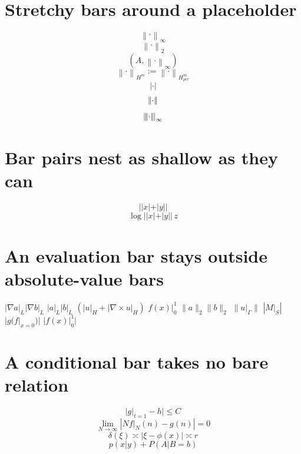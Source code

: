\documentclass{article}
\begin{document}
\section{Stretchy bars around a placeholder}
\[ \left\|\cdot\right\|_{\infty} \]
\[ \left\lVert\cdot\right\rVert_{2} \]
\[ (A,\left\|\cdot\right\|_{\infty}) \]
\[ \left\|\cdot\right\|_{H^m}:=\left\|\cdot\right\|_{H_{per}^m} \]
\[ \left|\cdot\right| \]
\[ \left|\kern-1pt\left|\cdot\right|\kern-1pt\right| \]
\[ \left|\kern-1pt\left|\kern-1pt\left|\cdot\right|\kern-1pt\right|\kern-1pt\right|_{\infty} \]

\section{Bar pairs nest as shallow as they can}
\[ ||x|+|y|| \]
\[ \log||x|+|y||\,z \]

\section{An evaluation bar stays outside absolute-value bars}
$|\nabla a|_{L}|\nabla b|_{L}$ $|a|_{L}|b|_{L}$ $(|u|_{H}+|\nabla\times u|_{H})$ $f(x)|_{0}^{1}$ $\|a\|_{2}\|b\|_{2}$
$\|u|_{\Gamma}\|$ $\left|M|_{S}\right|$ $|g(f|_{x=0})|$ $|f(x)|_{0}^{1}|$

\section{A conditional bar takes no bare relation}
\[ \bigg|g\big|_{t=1}-h\bigg|\leq C \]
\[ \lim_{N\to\infty}|Nf\big|_{N}(n)-g(n)|=0 \]
\[ \delta(\xi)\asymp|\xi-\phi(x)|\asymp r \]
\[ p(x|y)+P(A|B=b) \]
\end{document}
